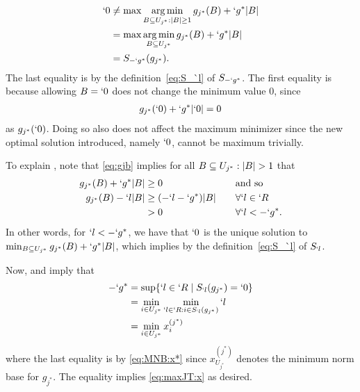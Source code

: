 \begin{Proof}
\begin{compactitem}
	\begin{align*}
		`0&\neq \max \operatorname*{arg\,min}_{B\subseteq U_{j^*}:\lvert B\rvert\geq 1} g_{j^*}(B)+`g^*\lvert B\rvert\\
		&= \max \operatorname*{arg\,min}_{B\subseteq U_{j^*}} g_{j^*}(B)+`g^*\lvert B\rvert\\
		&=S_{-`g^*}(g_{j^*}).
	\end{align*}
	The last equality is by the definition~\eqref{eq:S_`l} of $S_{-`g^*}$. The first equality is because allowing $B=`0$ does not change the minimum value $0$, since
	\begin{align*}
		g_{j^*}(`0)+`g^*\lvert`0\rvert=0
	\end{align*}
	 as $g_{j^*}(`0)$. Doing so also does not affect the maximum minimizer since the new optimal solution introduced, namely $`0$, cannot be maximum trivially.
	\item To explain , note that \eqref{eq:gjb} implies for all $B\subseteq U_{j^*}:\lvert B\rvert>1$ that
	\begin{alignat*}{2}
		g_{j^*}(B)+`g^*\lvert B\rvert &\geq 0&\kern1em& \text {and so}\\
		g_{j^*}(B)-`l\lvert B\rvert &\geq (-`l-`g^*) \lvert B\rvert && \forall `l\in `R\\
		& > 0 && \forall `l<-`g^*.
	\end{alignat*}
	In other words, for $`l<-`g^*$, we have that $`0$ is the unique solution to $\min_{B\subseteq U_{j^*}} g_{j^*}(B)+`g^*\lvert B\rvert$, which implies  by the definition~\eqref{eq:S_`l} of $S_{`l}$.
\end{compactitem}
Now,  and  imply that
\begin{align}
	-`g^*&=\sup \{`l\in `R\mid S_{`l}(g_{j^*})=`0\} \nonumber \\
	&= \min_{i\in U_{j^*}} \min_{`l\in `R:i\in S_{`l}(g_{j^*})} `l \nonumber \\
	&= \min_{i\in U_{j^*}} x^{(j^*)}_i
	\label{eq:gamma-xi}
\end{align}
where the last equality is by \eqref{eq:MNB:x*} since $x^{(j^*)}_{U_{j^*}}$ denotes the minimum norm base for $g_{j^*}$. The equality implies \eqref{eq:maxJT:x} as desired.


\end{Proof}
